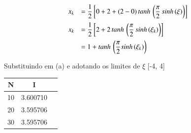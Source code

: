 \begin{equation}
 \label{cap2:sec8:eq10}
 \begin{array}{ll}
  x_k & = \displaystyle \frac{1}{2} \left[ 0 + 2 + (2 - 0) \, tanh \, \left( \frac{\pi}{2} \, sinh\,(\xi) \right) \right] \vspace*{0.2cm} \\
  x_k & = \displaystyle \frac{1}{2} \left[ 2 + 2 \, tanh \, \left( \frac{\pi}{2} \, sinh\,(\xi_k) \right) \right] \vspace*{0.2cm} \\
      & = 1 + tanh \, \left( \displaystyle \frac{\pi}{2} sinh\,(\xi_k) \right)
 \end{array}
\end{equation}

Substituindo em (a) e adotando os limites de $\xi$ [-4, 4]

{
\footnotesize
	\begin{center}
		\begin{tabular}{|c|c|c|}
		\hline		
		\textbf{N} & \textbf{I} \\
		\hline \hline
		10 & 3.600710 \\
		\hline
		20 & 3.595706 \\
		\hline
		30 & 3.595706 \\
		\hline
		\end{tabular}
	\end{center}
	\label{cap2:sec6:tab3}
}